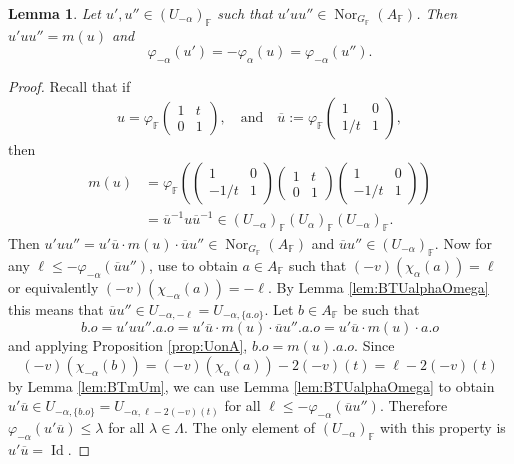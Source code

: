 \documentclass[12pt]{amsart}
\newcommand{\F}{\mathbb{F} }
\newcommand{\K}{\mathbb{K}}
\newcommand{\frakg}{\mathfrak{g}}
\numberwithin{equation}{section}
\newtheorem{lemma}[theorem]{Lemma}
\theoremstyle{remark} %
\begin{document}
		\begin{lemma}\label{lem:BTUUUm}%
			Let 
			$u',u'' \in (U_{-\alpha})_\F$ such that $u'uu'' \in \operatorname{Nor}_{G_\F}(A_\F)$. Then $u'uu'' = m(u)$ and
			$$
			\varphi_{-\alpha}(u') = - \varphi_{\alpha}(u) = \varphi_{-\alpha}(u'').
			$$
		\end{lemma}
		\begin{proof}
			Recall that if
			$$
			u = \varphi_\F\begin{pmatrix}
				1 & t \\ 0 & 1
			\end{pmatrix}, \quad \text{and} \quad \overline{u} := \varphi_\F \begin{pmatrix}
				1 & 0 \\ 1/t & 1
			\end{pmatrix},
			$$
			then
			\begin{align*}
				m(u)& = \varphi_\F \left(\begin{pmatrix}
					1 & 0 \\ -1/t & 1
				\end{pmatrix}\begin{pmatrix}
					1 & t \\ 0 & 1
				\end{pmatrix}\begin{pmatrix}
					1 & 0 \\ -1/t & 1
				\end{pmatrix} \right) \\
				&= \overline{u}^{-1}u\overline{u}^{-1} \in (U_{-\alpha})_\F(U_{\alpha})_\F(U_{-\alpha})_\F.
			\end{align*}
			Then $u'uu'' = u'\overline{u} \cdot m(u) \cdot \overline{u} u'' \in \operatorname{Nor}_{G_\F}(A_\F)$ and $\overline{u}u'' \in (U_{-\alpha})_\F$. Now for any $\ell \leq -\varphi_{-\alpha}(\overline{u}u'')$, use \cite[Lemma \ref{I-lem:Jacobson_Morozov_oneparam}]{AppAGRCF} to obtain $a\in A_\F$ such that $(-v)(\chi_\alpha(a)) = \ell $ or equivalently $(-v)(\chi_{-\alpha}(a)) = -\ell$. By Lemma \ref{lem:BTUalphaOmega} this means that $\overline{u}u'' \in U_{-\alpha, -\ell} = U_{-\alpha, \{ a.o\}}$. Let $b \in A_\F$ be such that
			$$
			b.o = u'uu'' . a.o = u'\overline{u} \cdot m(u) \cdot \overline{u}u''.a.o = u'\overline{u} \cdot m(u) \cdot a.o
			$$ 
			and applying Proposition \ref{prop:UonA}, $b.o = m(u).a.o$. Since
			$$
			(-v)(\chi_{-\alpha}(b)) = (-v)(\chi_{\alpha}(a)) -2(-v)(t) = \ell - 2(-v)(t)  
			$$
			by Lemma \ref{lem:BTmUm}, we can use Lemma \ref{lem:BTUalphaOmega} to obtain $u'\overline{u} \in U_{-\alpha, \{ b.o\}} = U_{-\alpha, \ell - 2(-v)(t)}$ for all $\ell \leq -\varphi_{-\alpha}(\overline{u}u'')$. Therefore $\varphi_{-\alpha}(u'\overline{u}) \leq \lambda$ for all $\lambda \in \Lambda$. The only element of $(U_{-\alpha})_\F$ with this property is $u'\overline{u} = \operatorname{Id}$. 
			

\end{proof}
\end{document}

